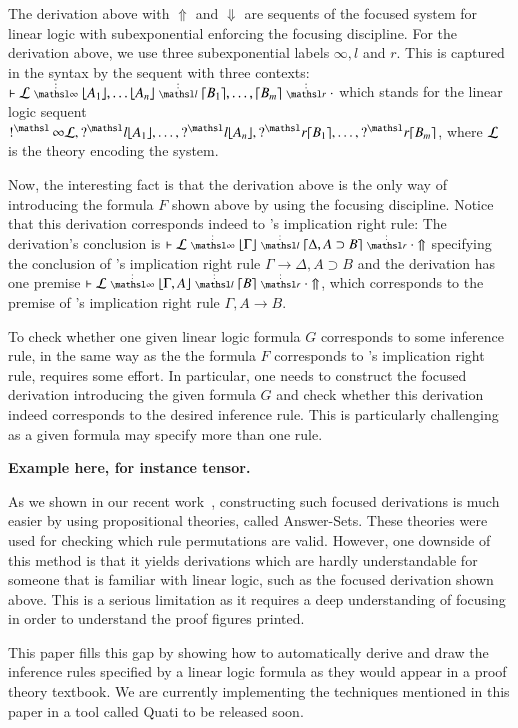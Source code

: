 \documentclass[a4paper,10pt]{article}
\newcommand\lra{\longrightarrow}
\begin{document}
The derivation above with $\Uparrow$ and $\Downarrow$
are sequents of the focused system for linear logic with subexponential enforcing the focusing 
discipline. For the derivation above, we use three subexponential labels $\infty, l$
and $r$. This is captured in the syntax by the sequent with three contexts: $\llfDash \lEnc \ndots{\infty}
\lft{A_1}, \ldots \lft{A_n}  \ndots{l} \rght{B_1}, \ldots, \rght{B_m} \ndots{r} \cdot$ which stands for the linear logic sequent
$\nbang{\infty} \lEnc, \nquest{l} \lft{A_1}, \ldots, \nquest{l} \lft{A_n}, \nquest{r} \rght{B_1}, \ldots, \nquest{r} \rght{B_m}$, 
where $\mathcal{L}$ is the theory encoding the system.

Now, the interesting fact is that the derivation above is the only way of introducing the formula $F$ 
shown above by using the focusing 
discipline. Notice that this derivation corresponds indeed to \mLJ's 
implication right rule: The derivation's conclusion is $\llfDash \lEnc \ndots{\infty}
\lft{\Gamma} \ndots{l} {\rght{\Delta, A \supset B}}
\ndots{r} \cdot \Uparrow$ specifying the conclusion of \mLJ's 
implication right rule $\Gamma \lra \Delta, A \supset B$ and 
the derivation has one premise $\llfDash \lEnc \ndots{\infty} \lft{\Gamma, A} \ndots{l} \rght{B} \ndots{r}
\cdot \Uparrow$, which corresponds to the premise of \mLJ's 
implication right rule $\Gamma, A \lra B$.

To check whether one given linear logic formula $G$ corresponds to some inference rule, in the same way as the 
the formula $F$ corresponds to \mLJ's implication right rule, requires some effort. In particular, one needs
to construct the focused derivation introducing the given formula $G$ and check whether this derivation indeed
corresponds to the desired inference rule. This is particularly challenging as a given formula may specify 
more than one rule. 

\textbf{Example here, for instance tensor.}

As we shown in our recent work~\cite{nigam13iclp}, constructing such focused derivations is 
much easier by using propositional theories, called Answer-Sets. These theories were used for
checking which rule permutations are valid. However, one downside of this method is that it 
yields derivations which are hardly understandable for someone that is familiar with linear logic, 
such as the focused derivation shown above. This is a serious limitation as it requires
a deep understanding of focusing in order to understand the proof figures printed.

This paper fills this gap by showing how to automatically derive and draw the inference rules
specified by a linear logic formula as they would appear in a proof theory textbook. We are currently
implementing the techniques mentioned in this paper in a tool called Quati to be released soon.
\end{document}
